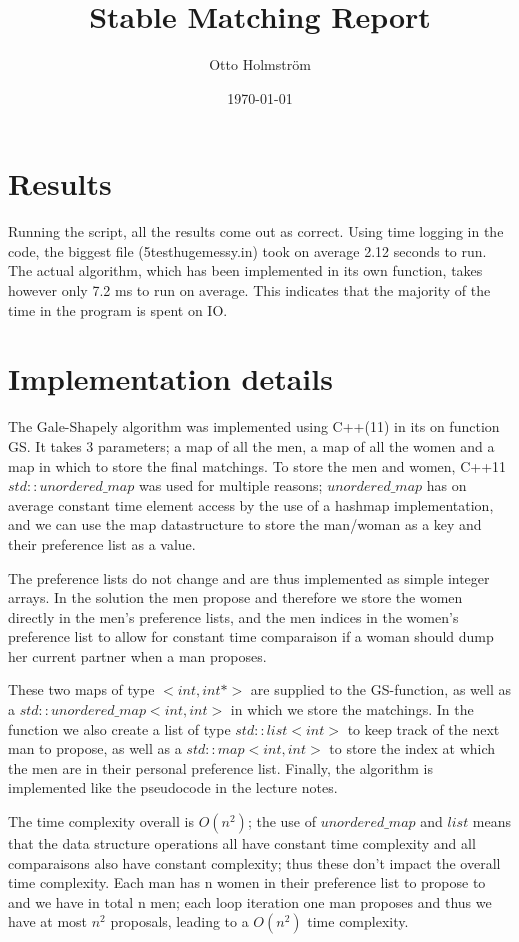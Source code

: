 \documentclass{article}
\title{Stable Matching Report}
\author{Otto Holmström}
\date{\today}
\begin{document}
  \maketitle

  \section{Results}
Running the script, all the results come out as correct. Using time logging in the code, the biggest file (5testhugemessy.in) took on average 2.12 seconds to run. The actual algorithm, which has been implemented in its own function, takes however only 7.2 ms to run on average. This indicates that the majority of the time in the program is spent on IO.


  \section{Implementation details}


The Gale-Shapely algorithm was implemented using C++(11) in its on function GS. It takes 3 parameters; a map of all the men, a map of all the women and a map in which to store the final matchings. To store the men and women, C++11 $std::unordered\_map$ was used for multiple reasons; $unordered\_map$ has on average constant time element access by the use of a hashmap implementation, and we can use the map datastructure to store the man/woman as a key and their preference list as a value. 

The preference lists do not change and are thus implemented as simple integer arrays. In the solution the men propose and therefore we store the women directly in the men's preference lists, and the men indices in the women's preference list to allow for constant time comparaison if a woman should dump her current partner when a man proposes.

These two maps of type $<int, int * >$ are supplied to the GS-function, as well as a $std::unordered\_map<int, int>$ in which we store the matchings. In the function we also create a list of type $std::list<int>$ to keep track of the next man to propose, as well as a $std::map<int, int>$ to store the index at which the men are in their personal preference list. Finally, the algorithm is implemented like the pseudocode in the lecture notes.

The time complexity overall is $O(n^2)$; the use of $unordered\_map$ and $list$ means that the data structure operations all have constant time complexity and all comparaisons also have constant complexity; thus these don't impact the overall time complexity. Each man has n women in their preference list to propose to and we have in total n men; each loop iteration one man proposes and thus we have at most $n^2$ proposals, leading to a $O(n^2)$ time complexity.
\end{document}
